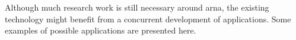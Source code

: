
Although much research work is still necessary around
\gls{arna}, the existing technology might benefit from a
concurrent development of applications. Some examples of
possible applications are presented here.
